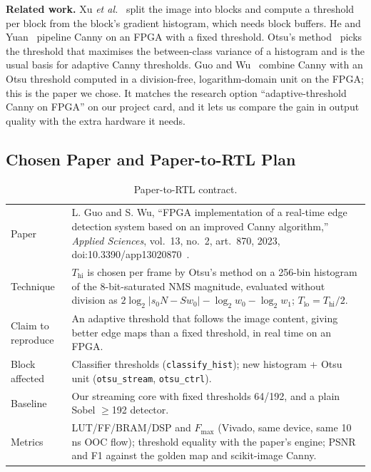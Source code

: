 \documentclass[11pt,a4paper]{article}
\begin{document}
\textbf{Related work.} Xu \emph{et al.}~\cite{xu2014} split the image into blocks and compute a threshold per block from the
block's gradient histogram, which needs block buffers. He and Yuan~\cite{he2008} pipeline Canny on an FPGA with a fixed
threshold. Otsu's method~\cite{otsu} picks the threshold that maximises the between-class variance of a histogram and is
the usual basis for adaptive Canny thresholds. Guo and Wu~\cite{guo2023} combine Canny with an Otsu threshold computed in
a division-free, logarithm-domain unit on the FPGA; this is the paper we chose. It matches the research option
``adaptive-threshold Canny on FPGA'' on our project card, and it lets us compare the gain in output quality with the extra
hardware it needs.

\subsection{Chosen Paper and Paper-to-RTL Plan}
\begin{table}[H]\centering\footnotesize
\caption{Paper-to-RTL contract.}\label{tab:contract}
\begin{tabularx}{\linewidth}{@{}lX@{}}
\toprule
Paper & L. Guo and S. Wu, ``FPGA implementation of a real-time edge detection system based on an improved Canny algorithm,''
\emph{Applied Sciences}, vol.~13, no.~2, art.~870, 2023, doi:10.3390/app13020870~\cite{guo2023}.\\
Technique & $T_\text{hi}$ is chosen per frame by Otsu's method on a 256-bin histogram of the 8-bit-saturated NMS magnitude,
evaluated without division as $2\log_2|s_0N-Sw_0|-\log_2 w_0-\log_2 w_1$; $T_\text{lo}=T_\text{hi}/2$.\\
Claim to reproduce & An adaptive threshold that follows the image content, giving better edge maps than a fixed threshold,
in real time on an FPGA.\\
Block affected & Classifier thresholds (\texttt{classify\_hist}); new histogram + Otsu unit (\texttt{otsu\_stream}, \texttt{otsu\_ctrl}).\\
Baseline & Our streaming core with fixed thresholds 64/192, and a plain Sobel $\ge$192 detector.\\
Metrics & LUT/FF/BRAM/DSP and $F_\text{max}$ (Vivado, same device, same 10\,ns OOC flow); threshold equality with the
paper's engine; PSNR and F1 against the golden map and scikit-image Canny.\\
\bottomrule
\end{tabularx}
\end{table}
\end{document}
